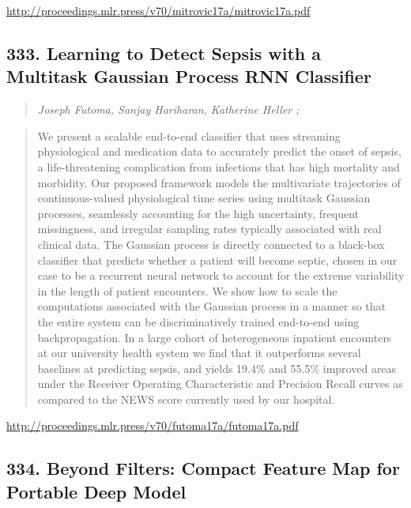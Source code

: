 \documentclass{article}
\begin{document}
\href{http://proceedings.mlr.press/v70/mitrovic17a/mitrovic17a.pdf}{http://proceedings.mlr.press/v70/mitrovic17a/mitrovic17a.pdf}

\subsection{333. Learning to Detect Sepsis with a Multitask Gaussian Process RNN Classifier}

\begin{quote}
\footnotesize{\textit{Joseph Futoma, Sanjay Hariharan, Katherine Heller ;}}

\end{quote}

\begin{quote}
    We present a scalable end-to-end classifier that uses streaming physiological and medication data to accurately predict the onset of sepsis, a life-threatening complication from infections that has high mortality and morbidity. Our proposed framework models the multivariate trajectories of continuous-valued physiological time series using multitask Gaussian processes, seamlessly accounting for the high uncertainty, frequent missingness, and irregular sampling rates typically associated with real clinical data. The Gaussian process is directly connected to a black-box classifier that predicts whether a patient will become septic, chosen in our case to be a recurrent neural network to account for the extreme variability in the length of patient encounters. We show how to scale the computations associated with the Gaussian process in a manner so that the entire system can be discriminatively trained end-to-end using backpropagation. In a large cohort of heterogeneous inpatient encounters at our university health system we find that it outperforms several baselines at predicting sepsis, and yields 19.4\% and 55.5\% improved areas under the Receiver Operating Characteristic and Precision Recall curves as compared to the NEWS score currently used by our hospital.  
\end{quote}

\href{http://proceedings.mlr.press/v70/futoma17a/futoma17a.pdf}{http://proceedings.mlr.press/v70/futoma17a/futoma17a.pdf}

\subsection{334. Beyond Filters: Compact Feature Map for Portable Deep Model}
\end{document}
